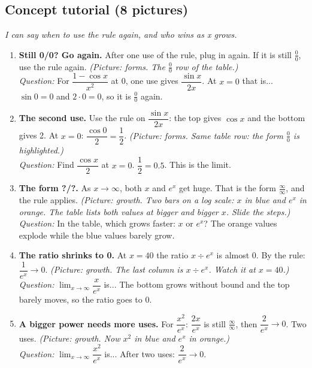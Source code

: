 \documentclass[11pt]{article}
\begin{document}
\subsection*{Concept tutorial (8 pictures)}
\textit{I can say when to use the rule again, and who wins as x grows.}\par
\begin{enumerate}
\item \textbf{Still 0/0? Go again.} After one use of the rule, plug in again. If it is still $\frac00$, use the rule again. \textit{(Picture: forms. The $\frac00$ row of the table.)}\\ \textit{Question:} For $\dfrac{1-\cos x}{x^2}$ at 0, one use gives $\dfrac{\sin x}{2x}$. At $x=0$ that is...  $\sin0=0$ and $2\cdot0=0$, so it is $\frac00$ again.
\item \textbf{The second use.} Use the rule on $\dfrac{\sin x}{2x}$: the top gives $\cos x$ and the bottom gives 2. At $x=0$: $\dfrac{\cos0}{2}=\dfrac12$. \textit{(Picture: forms. Same table row: the form $\frac00$ is highlighted.)}\\ \textit{Question:} Find $\dfrac{\cos x}{2}$ at $x=0$.  $\dfrac{1}{2}=0.5$. This is the limit.
\item \textbf{The form ?/?.} As $x\to\infty$, both $x$ and $e^x$ get huge. That is the form $\frac{\infty}{\infty}$, and the rule applies. \textit{(Picture: growth. Two bars on a log scale: $x$ in blue and $e^x$ in orange. The table lists both values at bigger and bigger $x$. Slide the steps.)}\\ \textit{Question:} In the table, which grows faster: $x$ or $e^x$?  The orange values explode while the blue values barely grow.
\item \textbf{The ratio shrinks to 0.} At $x=40$ the ratio $x\div e^x$ is almost 0. By the rule: $\dfrac{1}{e^x}\to0$. \textit{(Picture: growth. The last column is $x\div e^x$. Watch it at $x=40$.)}\\ \textit{Question:} $\displaystyle\lim_{x\to\infty}\dfrac{x}{e^x}$ is...  The bottom grows without bound and the top barely moves, so the ratio goes to 0.
\item \textbf{A bigger power needs more uses.} For $\dfrac{x^2}{e^x}$: $\dfrac{2x}{e^x}$ is still $\frac{\infty}{\infty}$, then $\dfrac{2}{e^x}\to0$. Two uses. \textit{(Picture: growth. Now $x^2$ in blue and $e^x$ in orange.)}\\ \textit{Question:} $\displaystyle\lim_{x\to\infty}\dfrac{x^2}{e^x}$ is...  After two uses: $\dfrac{2}{e^x}\to0$.

\end{enumerate}
\end{document}
